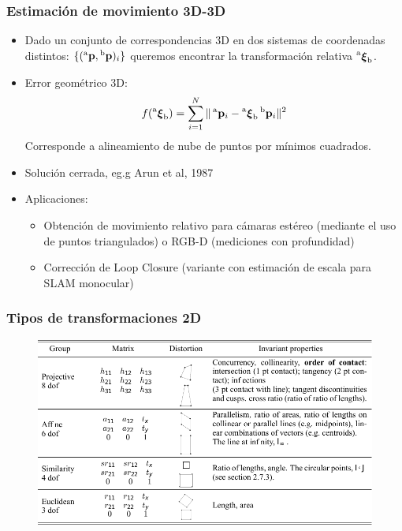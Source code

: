 \begin{frame}
	\frametitle{Estimación de movimiento 3D-3D}
	\footnotesize
	
	\begin{itemize}
		\item Dado un conjunto de correspondencias 3D en dos sistemas de coordenadas distintos: $\{(\prescript{\mathrm{a}}{}{\boldsymbol{\mathbf{p}}}, \prescript{\mathrm{b}}{}{\boldsymbol{\mathbf{p}}})_{i}\}$ queremos encontrar la transformación relativa $\prescript{\mathrm{a}}{}{{\boldsymbol{\mathbf{\xi}}}_\mathrm{b}}$.
		\item Error geométrico 3D:
		\[
		f(\prescript{\mathrm{a}}{}{{\boldsymbol{\mathbf{\xi}}}_\mathrm{b}})= \sum_{i=1}^{N} \Vert \prescript{\mathrm{a}}{}{\boldsymbol{\mathbf{p}}}_{i} - \prescript{\mathrm{a}}{}{{\boldsymbol{\mathbf{\xi}}}_\mathrm{b}} \prescript{\mathrm{b}}{}{\boldsymbol{\mathbf{p}}}_{i} \Vert^{2}
		\]
		Corresponde a alineamiento de nube de puntos por mínimos cuadrados.
		\item Solución cerrada, eg.g Arun et al, 1987
		\item Aplicaciones:
		\begin{itemize}
			\item Obtención de movimiento relativo para cámaras estéreo (mediante el uso de puntos triangulados) o RGB-D (mediciones con profundidad)
			\item Corrección de Loop Closure (variante con estimación de escala para SLAM monocular)
		\end{itemize}
	\end{itemize}
	
\end{frame}

\begin{frame}
	\frametitle{Tipos de transformaciones 2D}
	\footnotesize
	
	\begin{figure}
		\includegraphics[width=0.9\columnwidth]{./images/transformation_table_2d.pdf}
	\end{figure}
	
\end{frame}

